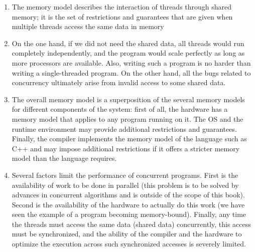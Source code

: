 \begin{enumerate}
\item 
The memory model describes the interaction of threads through shared memory; it is the set of restrictions and guarantees that are given when multiple threads access the same data in memory

\item 
On the one hand, if we did not need the shared data, all threads would run completely independently, and the program would scale perfectly as long as more processors are available. Also, writing such a program is no harder than writing a single-threaded program. On the other hand, all the bugs related to concurrency ultimately arise from invalid access to some shared data.

\item 
The overall memory model is a superposition of the several memory models for different components of the system: first of all, the hardware has a memory model that applies to any program running on it. The OS and the runtime environment may provide additional restrictions and guarantees. Finally, the compiler implements the memory model of the language such as C++ and may impose additional restrictions if it offers a stricter memory model than the language requires.

\item
Several factors limit the performance of concurrent programs. First is the availability of work to be done in parallel (this problem is to be solved by advances in concurrent algorithms and is outside of the scope of this book). Second is the availability of the hardware to actually do this work (we have seen the example of a program becoming memory-bound). Finally, any time the threads must access the same data (shared data) concurrently, this access must be synchronized, and the ability of the compiler and the hardware to optimize the execution across such synchronized accesses is severely limited.

\end{enumerate}